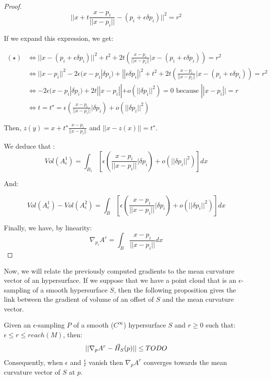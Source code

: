 \begin{proof}
\begin{equation}
    || x + t \frac{x - p_i}{||x - p_i||} - (p_i + \epsilon \delta p_i) ||^2 = r^2
    \tag{$\star$}
\end{equation}

If we expand this expression, we get:

\begin{align*}
    (\star) & \iff || x - (p_i + \epsilon \delta p_i) ||^2 + t^2 + 2t \left(
        \frac{x-p_i}{|| x - p_i||} | x - (p_i + \epsilon \delta p_i) \right) = r^2 \\
    & \iff || x - p_i || ^2 - 2 \epsilon (x - p_i | \delta p_i) + || \epsilon \delta p_i || ^2 + t^2 + 2t
    \left( \frac{x-p_i}{|| x - p_i||} | x - (p_i + \epsilon \delta p_i) \right) = r^2 \\
    & \iff -2 \epsilon (x - p_i | \delta p_i) + 2t || x - p_i|| + o(||\delta p_i||^2) = 0
    \text{ because } || x - p_i || = r \\
    & \iff t = t^{\star} = \epsilon \left( \frac{x - p_i}{||x - p_i||} | \delta p_i \right) +
    o(||\delta p_i||^2)
\end{align*}

Then, $ z(y) = x + t^{\star} \frac{x - p_i}{||x - p_i||} $ and $ || x - z(x) || =
t^{\star} $.

We deduce that :
$$ Vol(A^1_\epsilon) = \int_{B_1} \left[ \epsilon \left( \frac{x - p_i}{||x -
            p_i||} | \delta p_i \right) + o(||\delta p_i||^2) \right] dx $$

And:

$$ Vol(A^1_\epsilon) - Vol(A^2_\epsilon) = \int_{B} \left[ \epsilon \left(
        \frac{x - p_i}{||x - p_i||} | \delta p_i \right) + o(||\delta p_i||^2)
\right] dx $$

Finally, we have, by linearity:
$$ \nabla_{p_i} A^r = \int_{B} \frac{x - p_i}{||x - p_i||} dx $$

\end{proof}

Now, we will relate the previously computed gradients to the mean curvature
vector of an hypersurface. If we suppose that we have a point cloud that is an
$\epsilon$-sampling of a smooth hypersurface $ S $, then the following
proposition gives the link between the gradient of volume of an offset of $ S $
and the mean curvature vector.

\begin{proposition}
    Given an $\epsilon$-sampling $ P $ of a smooth ($ C^{\infty} $) hypersurface
    $ S $ and $ r \ge 0 $ such that: $ \epsilon \leq r \leq reach(M) $, then:
    \begin{equation}
        || \nabla_p A^r - \vec{H}_{S}(p) || \leq TODO
    \end{equation}
    Consequently, when $ \epsilon $ and $ \frac{\epsilon}{r} $ vanish then
    $ \nabla_p A^r $ converges towards the mean curvature vector of $ S $ at $ p $.
    \label{prop:gradient-mean-curvature}
\end{proposition}

